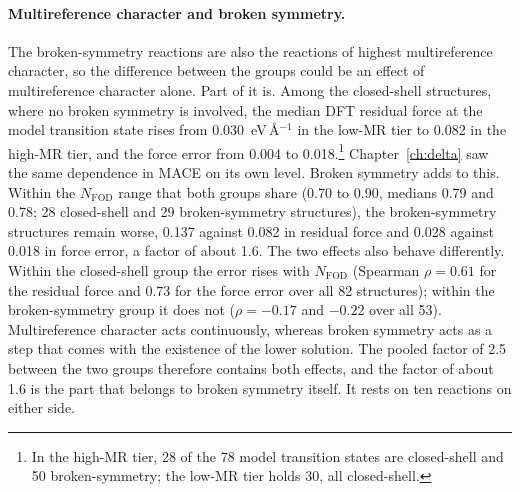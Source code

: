 \paragraph{Multireference character and broken symmetry.} The
broken-symmetry reactions are also the reactions of highest
multireference character, so the difference between the groups could be
an effect of multireference character alone. Part of it is. Among the
closed-shell structures, where no broken symmetry is involved, the
median DFT residual force at the model transition state rises from
0.030~eV\,\AA$^{-1}$ in the low-MR tier to 0.082 in the high-MR tier,
and the force error from 0.004 to 0.018.\footnote{In the high-MR tier,
28 of the 78 model transition states are closed-shell and 50
broken-symmetry; the low-MR tier holds 30, all closed-shell.}
Chapter~\ref{ch:delta} saw the same dependence in MACE on its own level.
Broken symmetry adds to this. Within the $N_\mathrm{FOD}$ range that
both groups share (0.70 to 0.90, medians 0.79 and 0.78; 28 closed-shell
and 29 broken-symmetry structures), the broken-symmetry structures
remain worse, 0.137 against 0.082 in residual force and 0.028 against
0.018 in force error, a factor of about 1.6. The two effects also behave
differently. Within the closed-shell group the error rises with
$N_\mathrm{FOD}$ (Spearman $\rho = 0.61$ for the residual force and
$0.73$ for the force error over all 82 structures); within the
broken-symmetry group it does not ($\rho = -0.17$ and $-0.22$ over all
53). Multireference character acts continuously, whereas broken
symmetry acts as a step that comes with the existence of the lower
solution. The pooled factor of 2.5 between the two groups therefore
contains both effects, and the factor of about 1.6 is the part that
belongs to broken symmetry itself. It rests on ten reactions on either
side.

